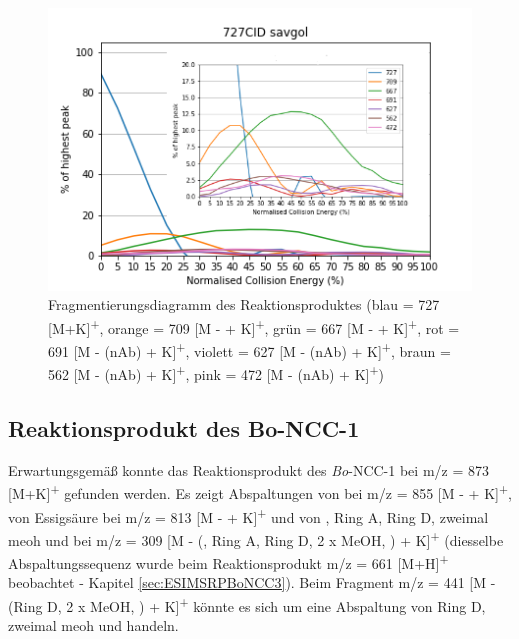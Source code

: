 \begin{figure}[!htbp]
  \centering
  \includegraphics[scale=0.7]{figures/Kapitel4/Kataboliten/diags/727CID-savgol.png}
  \caption[Fragmentierungsdiagramm des Reaktionsproduktes von \textit{Bo}-DNCC, Quelle: Autor]{Fragmentierungsdiagramm des Reaktionsproduktes (blau = 727 [M+K]\textsuperscript{+}, orange = 709 [M -  + K]\textsuperscript{+}, grün = 667 [M -  + K]\textsuperscript{+}, rot = 691 [M - (\gls{nAb}) + K]\textsuperscript{+}, violett = 627 [M - (\gls{nAb}) + K]\textsuperscript{+}, braun = 562 [M - (\gls{nAb}) + K]\textsuperscript{+}, pink = 472 [M - (\gls{nAb}) + K]\textsuperscript{+})}
  \label{fig:727MKLeafspraydiags}
\end{figure}



\subsection{Reaktionsprodukt des Bo-NCC-1}

Erwartungsgemäß konnte das Reaktionsprodukt des \textit{Bo}-NCC-1 bei m/z = 873 [M+K]\textsuperscript{+} gefunden werden. Es zeigt Abspaltungen von  bei m/z = 855 [M -  + K]\textsuperscript{+}, von Essigsäure bei m/z = 813 [M -  + K]\textsuperscript{+} und von , Ring A, Ring D, zweimal \gls{meoh} und  bei m/z = 309 [M - (, Ring A, Ring D, 2 x MeOH, )  + K]\textsuperscript{+} (diesselbe Abspaltungssequenz wurde beim Reaktionsprodukt m/z = 661 [M+H]\textsuperscript{+} beobachtet - Kapitel \ref{sec:ESIMSRPBoNCC3}). Beim Fragment m/z = 441 [M - (Ring D, 2 x MeOH, ) + K]\textsuperscript{+} könnte es sich um eine Abspaltung von Ring D, zweimal \gls{meoh} und  handeln. 


